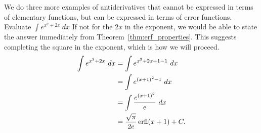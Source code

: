 We do three more examples of antiderivatives that cannot be expressed in terms of elementary functions, but can be expressed in terms of error functions.\\

{Evaluate $\int e^{x^2+2x}\ dx$}
{If not for the $2x$ in the exponent, we would be able to state the answer immediately from Theorem~\ref{thm:erf_properties}.  This suggests completing the square in the exponent, which is how we will proceed.
\begin{align*}
\int e^{x^2+2x}\ dx &= \int e^{x^2+2x+1 - 1}\ dx\\
&= \int e^{(x+1)^2 - 1}\ dx\\
&= \int \frac{e^{(x+1)^2}}{e} \ dx\\
&= \frac{\sqrt{\pi}}{2e} \operatorname{erfi}(x+1) +C.
\end{align*}
}\\\clearpage

